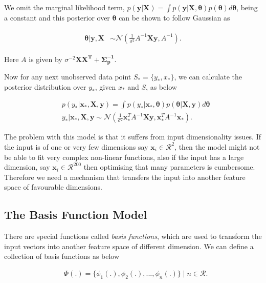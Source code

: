\documentclass[english]{tktltiki}
\begin{document}
We omit the marginal likelihood term, $p(\mathbf{y} | \mathbf{X}) = \int p(\mathbf{y} | \mathbf{X}, \boldsymbol \theta)p(\boldsymbol \theta)d\boldsymbol \theta$, being a constant and this posterior over $\boldsymbol \theta$ can be shown to follow Gaussian as

\begin{eqnarray}
\begin{split}
\boldsymbol \theta | \mathbf{y}, \mathbf{X} & \sim \mathcal{N}(\frac{1}{\sigma^2} A^{-1} \mathbf{Xy}, A^{-1}).
\end{split}
\end{eqnarray}

Here $A$ is given by $\sigma^{-2} \mathbf{XX^T + \Sigma_p^{-1}}$.

Now for any next unobserved data point $S_* = \{y_*, x_*\}$, we can calculate the posterior distribution over $y_*$, given $x_*$ and $S$, as below

\begin{equation}
\label{conti_rnd_var_bayes_poster}
\begin{split}
	&p(y_* | \mathbf{x}_*, \mathbf{X}, \mathbf{y}) = \int p(y_* | \mathbf{x}_*, \boldsymbol\theta)p(\boldsymbol\theta | \mathbf{X}, \mathbf{y})d \boldsymbol\theta \\
	&y_* | \mathbf{x}_*, \mathbf{X}, \mathbf{y} \sim \mathcal{N}(\frac{1}{\sigma^2}\mathbf{x}_*^T A^{-1} \mathbf{Xy}, \mathbf{x}_*^T A^{-1} \mathbf{x}_*).
\end{split}
\end{equation}

The problem with this model is that it suffers from input dimensionality issues. If the input is of one or very few dimensions say $\mathbf{x}_i \in \mathcal{R}^2$, then the model might not be able to fit very complex non-linear functions, also if the input has a large dimension, say $\mathbf{x}_i \in \mathcal{R}^{200}$ then optimising that many parameters is cumbersome. Therefore we need a mechanism that transfers the input into another feature space of favourable dimensions.


\subsection{The Basis Function Model}
There are special functions called \textit{basis functions}, which are used to transform the input vectors into another feature space of different dimension. We can define a collection of basis functions as below

\begin{equation}
\label{eqn:basis_function}
\begin{split}
	&\Phi(.) = \{\phi_1(.), \phi_2(.), ...,\phi_n(.)\} \mid n \in \mathcal{R}.
\end{split}
\end{equation}
\end{document}
